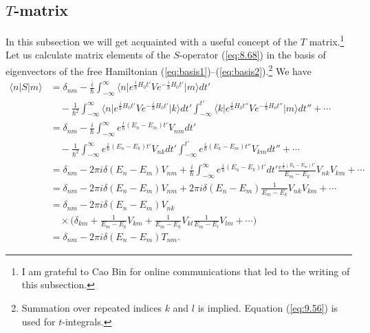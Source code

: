 \documentclass[]{stefan1}
\begin{document}
\subsection{$T$-matrix}\label{ss:t-matrix}
In this subsection we will get acquainted with a useful concept of the
$ T $ matrix.\footnote{I am grateful to Cao Bin for online
communications that led to the writing of this subsection.} Let us
calculate matrix elements of the $ S $-operator (\ref{eq:8.68}) in the
basis of eigenvectors of the free Hamiltonian
(\ref{eq:basis1})--(\ref{eq:basis2}).\footnote{Summation over repeated
indices $ k $ and $ l $ is implied. Equation (\ref{eq:9.56}) is used for
$ t $-integrals.} We have
%
\begin{align}
\langle n|S|m \rangle
&=\delta_{nm} -\frac{i}{\hbar } \int_{-\infty }^{\infty }
\langle n \vert e^{\frac{i}{\hbar }H_{0} t'} V e^{-\frac{i}{\hbar }H_{0} t'} \vert m
\rangle dt'
\nonumber
\\
&\quad  -\frac{1}{\hbar^{2}} \int_{-\infty }^{\infty } \langle n
\vert e^{\frac{i}{\hbar }H_{0} t'} V e^{-\frac{i}{\hbar }H_{0} t'} \vert k \rangle
dt' \int_{-\infty }^{t'} \langle k \vert e^{\frac{i}{\hbar }H_{0} t''} V e^{-\frac{i}{\hbar }H_{0}
t''} \vert m \rangle
dt'' + \cdots
\nonumber
\\
&=\delta_{nm} -\frac{i}{\hbar } \int_{-\infty }^{\infty }
e^{\frac{i}{
\hbar }(E_{n} - E_{m}) t'} V_{nm} dt'
\nonumber
\\
&\quad  -\frac{1}{\hbar^{2}} \int_{-\infty }^{\infty }
e^{\frac{i}{\hbar
}(E_{n}
- E_{k}) t'} V_{nk} dt' \int_{-\infty }^{t'}
e^{\frac{i}{
\hbar }(E_{k} - E_{m}) t''} V_{km} dt'' + \cdots
\nonumber
\\
&=\delta_{nm} -2 \pi i \delta (E_{n} - E_{m})
V_{nm} +\frac{i}{
\hbar } \int_{-\infty }^{\infty }
e^{\frac{i}{\hbar }(E_{n} - E_{k}) t'} dt' \frac{e^{\frac{i}{\hbar }(E_{k} - E_{m}) t'}}{E_{m} - E_{k}} V _{nk}
V_{km} + \cdots
\nonumber
\\
&=\delta_{nm} -2 \pi i \delta (E_{n} - E_{m})
V_{nm} +2\pi i \delta (E_{n} - E_{m})
\frac{1}{E_{m} - E_{k}} V_{nk} V_{km} + \cdots
\nonumber
\\
&=\delta_{nm} -2 \pi i \delta (E_{n} - E_{m})
V_{nk}
\nonumber
\\
&\quad  \times\biggl( \delta_{km} + \frac{ 1}{E_{m} -
E_{k}}V_{km} +
\frac{ 1}{E
_{m} - E_{k}}V_{kl} \frac{ 1}{E_{m} - E_{l}} V_{lm} + \cdots
\biggr)
\nonumber
\\
&=\delta_{nm} -2 \pi i \delta (E_{n} - E_{m})
T_{nm}. \label{eq:Snm}
\end{align}
\end{document}
